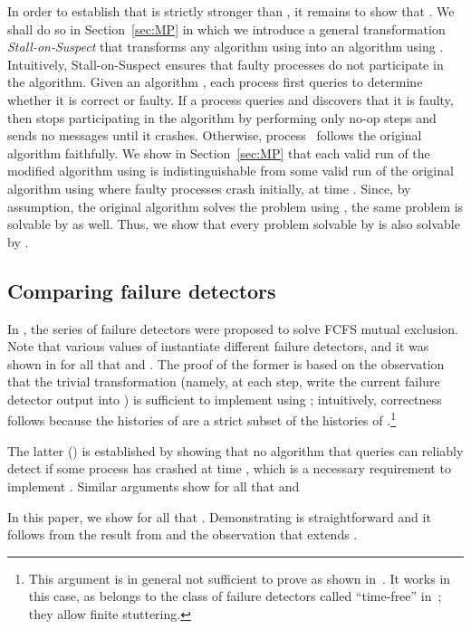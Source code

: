 \documentclass[11pt]{article}
\begin{document}
In order to establish that  is strictly stronger than , it
     remains to show that .
We shall do so in Section~\ref{sec:MP} in which we introduce a general
     transformation \emph{Stall-on-Suspect} that transforms any
     algorithm  using  into an algorithm  using
     .
Intuitively, Stall-on-Suspect ensures that faulty processes do not
     participate in the algorithm.
Given an algorithm , each process first queries  to
     determine whether it is correct or faulty.
If a process  queries  and discovers that it is faulty,
     then  stops participating in the algorithm by performing
     only no-op steps and sends no messages until it crashes.
Otherwise, process~ follows the original algorithm 
     faithfully.
We show in Section~\ref{sec:MP} that each valid run of the modified
     algorithm using  is indistinguishable from some valid run
     of the original algorithm using  where faulty processes
     crash initially, at time .
Since, by assumption, the original algorithm solves the  problem using
     , the same problem is solvable by  as well.
Thus, we show that every problem solvable by  is also solvable
     by .

\subsection{Comparing  failure detectors}

In \cite{bhatt:oteow}, the series of  failure detectors were
     proposed to solve FCFS mutual exclusion.
Note that various values of  instantiate different failure
     detectors, and it was shown in \cite{bhatt:oteow} for all  that  and .
The proof of the former is based on the observation that the trivial
     transformation (namely, at each step, write the current failure detector
     output into ) is sufficient to implement
      using ; intuitively, correctness follows because the histories of
      are a strict subset of the histories of
     .\footnote{This argument is in general not sufficient
     to prove  as shown in~\cite{charron-bost:10:isolt}.
It works in this case, as  belongs to the class of failure
     detectors called ``time-free'' in~\cite{charron-bost:10:isolt};
     they allow finite stuttering.}

The latter () is established by
     showing that no algorithm that queries  can reliably
     detect if some process has crashed at time , which is a
     necessary requirement to implement .
Similar arguments show  for all  that  and   


In this paper, we show for all  that .
Demonstrating  is straightforward and it
     follows from the result  from
     \cite{bhatt:oteow} and the observation that  extends
      \cite{chan:ufdfr}.
\end{document}
